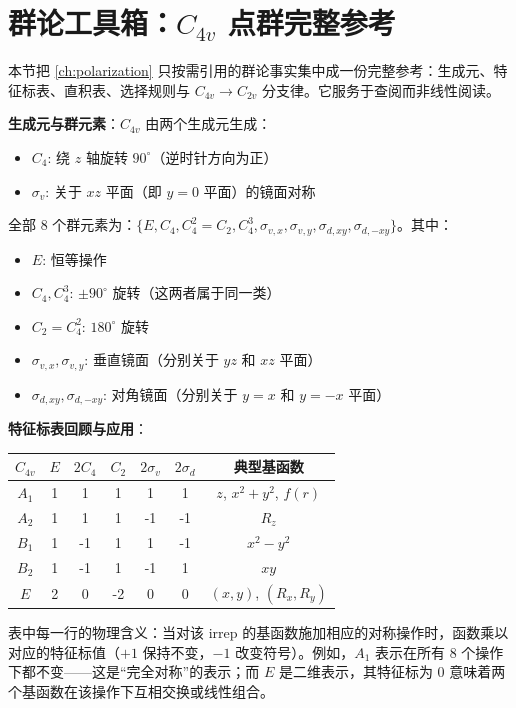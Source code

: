 \section{群论工具箱：\texorpdfstring{$C_{4v}$}{C4v} 点群完整参考}
\label{sec:group-theory-toolbox}
本节把 \cref{ch:polarization} 只按需引用的群论事实集中成一份完整参考：生成元、特征标表、直积表、选择规则与 $C_{4v}\to C_{2v}$ 分支律。它服务于查阅而非线性阅读。

\textbf{生成元与群元素}：$C_{4v}$ 由两个生成元生成：
\begin{itemize}
  \item $C_4$: 绕 $z$ 轴旋转 $90^\circ$（逆时针方向为正）
  \item $\sigma_v$: 关于 $xz$ 平面（即 $y=0$ 平面）的镜面对称
\end{itemize}
全部 8 个群元素为：$\{E, C_4, C_4^2=C_2, C_4^3, \sigma_{v,x}, \sigma_{v,y}, \sigma_{d,xy}, \sigma_{d,-xy}\}$。其中：
\begin{itemize}
  \item $E$: 恒等操作
  \item $C_4, C_4^3$: $\pm 90^\circ$ 旋转（这两者属于同一类）
  \item $C_2=C_4^2$: $180^\circ$ 旋转
  \item $\sigma_{v,x}, \sigma_{v,y}$: 垂直镜面（分别关于 $yz$ 和 $xz$ 平面）
  \item $\sigma_{d,xy}, \sigma_{d,-xy}$: 对角镜面（分别关于 $y=x$ 和 $y=-x$ 平面）
\end{itemize}

\textbf{特征标表回顾与应用}：
\begin{center}
\renewcommand{\arraystretch}{1.2}
\begin{tabular}{c|ccccc|c}
$C_{4v}$ & $E$ & $2C_4$ & $C_2$ & $2\sigma_v$ & $2\sigma_d$ & 典型基函数 \\ \hline
$A_1$ & 1 & 1 & 1 & 1 & 1 & $z$, $x^2+y^2$, $f(r)$ \\
$A_2$ & 1 & 1 & 1 & -1 & -1 & $R_z$ \\
$B_1$ & 1 & -1 & 1 & 1 & -1 & $x^2-y^2$ \\
$B_2$ & 1 & -1 & 1 & -1 & 1 & $xy$ \\
$E$ & 2 & 0 & -2 & 0 & 0 & $(x,y)$, $(R_x,R_y)$ \\
\end{tabular}
\end{center}
\renewcommand{\arraystretch}{1.0}

表中每一行的物理含义：当对该 irrep 的基函数施加相应的对称操作时，函数乘以对应的特征标值（$+1$ 保持不变，$-1$ 改变符号）。例如，$A_1$ 表示在所有 8 个操作下都不变——这是“完全对称”的表示；而 $E$ 是二维表示，其特征标为 0 意味着两个基函数在该操作下互相交换或线性组合。

